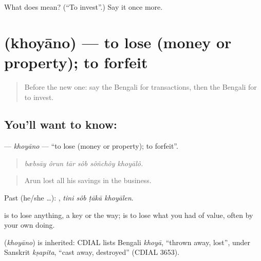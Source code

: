 \begin{tcolorbox}[breakable,colback=teal!4,colframe=teal!35!black,title={Before you move on}]
What does   mean? (\textquotedblleft{}To invest\textquotedblright{}.) Say it once more.
\end{tcolorbox}
\section[\texorpdfstring{\bn{খোয়ানো} (khoyāno)}{খোয়ানো (khoyāno)}]{ (khoyāno) — to lose (money or property); to forfeit}

\label{lesson:BN-C415-khoyano}



\begin{quote}
Before the new one: say the Bengali for transactions, then the Bengali for to invest.
\end{quote}

\subsection*{You'll want to know: }
\textbf{} — \emph{khoyāno} — \textquotedblleft{}to lose (money or property); to forfeit\textquotedblright{}.

\begin{quote}
     
\end{quote}

\begin{quote}
\emph{bæbsāy ôrun tār sôb sôñchôy khoyālô.}
\end{quote}

\begin{quote}
Arun lost all his savings in the business.
\end{quote}

Past (he/she …):    , \emph{tini sôb ṭākā khoyālen}.

 is to lose anything, a key or the way;  is to lose what you had of value, often by your own doing.

\begin{cousinweb}
\textbf{} (\emph{khoyāno}) is inherited: CDIAL lists Bengali \emph{khoyā}, \textquotedblleft{}thrown away, lost\textquotedblright{}, under Sanskrit \emph{kṣapita}, \textquotedblleft{}cast away, destroyed\textquotedblright{} (CDIAL 3653).
\end{cousinweb}

